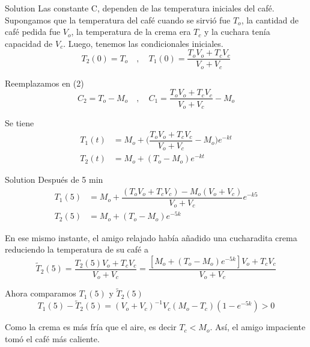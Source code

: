 \documentclass[10 pt]{beamer}
\begin{document}
\begin{frame}
    \begin{block}{Solution}
        Las constante C, dependen de las temperatura iniciales del café. Supongamos que la temperatura del café cuando se sirvió fue $T_o$, la cantidad de café pedida fue $V_o$, la temperatura de la crema era $T_c$ y la cuchara tenía capacidad de $V_c$. Luego, tenemos las condicionales iniciales.
        \begin{equation*}
            T_2(0) = T_o \quad,\quad T_1(0) = \dfrac{T_o V_o + T_c V_c}{V_o + V_c}
        \end{equation*}

        Reemplazamos en (2)
        \begin{equation*}
            C_2 = T_o - M_o \quad,\quad C_1 = \dfrac{T_oV_o + T_cV_c}{V_o + V_c} - M_o
        \end{equation*}

        Se tiene
        \begin{align*}
            T_1(t) & = M_o + \bigg (\dfrac{T_oV_o + T_cV_c}{V_o + V_c} - M_o \bigg) e^{-kt} \\
            T_2(t) & = M_o + (T_o - M_o)e^{-kt}
        \end{align*}
    \end{block}

\end{frame}

\begin{frame}
    \begin{block}{Solution}
        Después de 5 min
        \begin{align*}
            T_1(5) & = M_o + \dfrac{(T_oV_o + T_cV_c) - M_o(V_o + V_c)}{V_o + V_c} e^{-k5} \\
            T_2(5) & = M_o + (T_o - M_o)e^{-5k}
        \end{align*}

        En ese mismo instante, el amigo relajado había añadido una cucharadita crema reduciendo la temperatura de su café a
        \begin{equation}
            \widetilde{T}_2(5) = \dfrac{T_2(5)V_o + T_cV_c}{V_o + V_c} = \dfrac{[M_o + (T_o - M_o)e^{-5k}]V_o + T_cV_c}{V_o + V_c}
        \end{equation}

        Ahora comparamos $T_1(5)$ y $\widetilde{T}_2(5)$
        \begin{equation}
            T_1(5) - \widetilde{T}_2(5) = (V_o + V_c)^{-1} V_c(M_o - T_c) (1 - e^{-5k}) > 0
        \end{equation}

        Como la crema es más fría que el aire, es decir $T_c < M_o$. Así, el amigo impaciente tomó el café más caliente.
    \end{block}
\end{frame}
\end{document}
